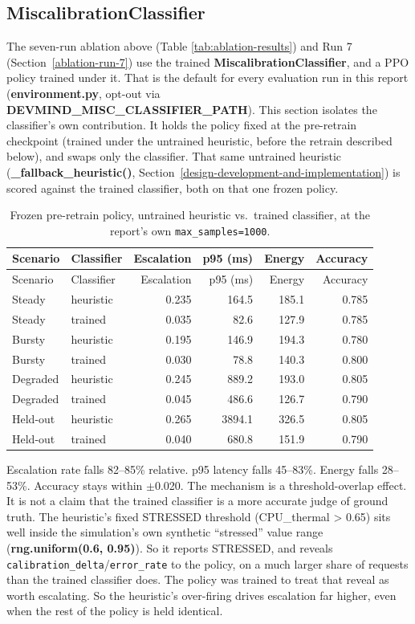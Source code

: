 \hypertarget{misc-classifier-refit}{%
\subsection{MiscalibrationClassifier}\label{misc-classifier-refit}}

The seven-run ablation above (Table \ref{tab:ablation-results}) and
Run 7 (Section~\ref{ablation-run-7}) use the trained \textbf{MiscalibrationClassifier},
and a PPO policy trained under it. That is the default for every
evaluation run in this report (\textbf{environment.py}, opt-out via
\textbf{DEVMIND\_MISC\_CLASSIFIER\_PATH}). This section isolates the
classifier's own contribution. It holds the policy fixed at the
pre-retrain checkpoint (trained under the untrained heuristic, before
the retrain described below), and swaps only the classifier. That same
untrained heuristic (\textbf{\_fallback\_heuristic()}, Section~\ref{design-development-and-implementation}) is
scored against the trained classifier, both on that one frozen policy.

\begin{longtable}{llrrrr}
\caption{Frozen pre-retrain policy, untrained heuristic vs.\ trained classifier, at the report's own \texttt{max\_samples=1000}.}\label{tab:misc-classifier-comparison}\\
\toprule
Scenario & Classifier & Escalation & p95 (ms) & Energy & Accuracy \\
\midrule
\endfirsthead
\toprule
Scenario & Classifier & Escalation & p95 (ms) & Energy & Accuracy \\
\midrule
\endhead
Steady & heuristic & 0.235 & 164.5 & 185.1 & 0.785 \\
Steady & trained & 0.035 & 82.6 & 127.9 & 0.785 \\
\addlinespace
Bursty & heuristic & 0.195 & 146.9 & 194.3 & 0.780 \\
Bursty & trained & 0.030 & 78.8 & 140.3 & 0.800 \\
\addlinespace
Degraded & heuristic & 0.245 & 889.2 & 193.0 & 0.805 \\
Degraded & trained & 0.045 & 486.6 & 126.7 & 0.790 \\
\addlinespace
Held-out & heuristic & 0.265 & 3894.1 & 326.5 & 0.805 \\
Held-out & trained & 0.040 & 680.8 & 151.9 & 0.790 \\
\bottomrule
\end{longtable}

Escalation rate falls 82--85\% relative. p95 latency falls 45--83\%.
Energy falls 28--53\%. Accuracy stays within $\pm$0.020. The mechanism
is a threshold-overlap effect. It is not a claim that the trained
classifier is a more accurate judge of ground truth. The heuristic's
fixed STRESSED threshold (CPU\_thermal \textgreater{} 0.65) sits well
inside the simulation's own synthetic ``stressed'' value range
(\textbf{rng.uniform(0.6, 0.95)}). So it reports STRESSED, and reveals
\texttt{calibration\_delta}/\texttt{error\_rate} to the policy, on a
much larger share of requests than the trained classifier does. The
policy was trained to treat that reveal as worth escalating. So the
heuristic's over-firing drives escalation far higher, even when the
rest of the policy is held identical.

